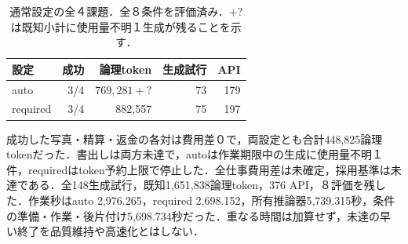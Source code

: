 \begin{table}[tb]
\centering\footnotesize\setlength{\tabcolsep}{3pt}
\caption{通常設定の全４課題．全８条件を評価済み．$+?$は既知小計に使用量不明１生成が残ることを示す．}
\begin{tabular}{lrrrr}
設定 & 成功 & 論理token & 生成試行 & API \\ \hline
auto & 3/4 & $769,281+?$ & 73 & 179 \\
required & 3/4 & 882,557 & 75 & 197 \\
\hline\end{tabular}
\end{table}
成功した写真・精算・返金の各対は費用差０で，両設定とも合計448,825論理tokenだった．書出しは両方未達で，autoは作業期限中の生成に使用量不明１件，requiredはtoken予約上限で停止した．全仕事費用差は未確定，採用基準は未達である．全148生成試行，既知1,651,838論理token，376 API，８評価を残した．作業秒はauto 2,976.265，required 2,698.152，所有推論器5,739.315秒，条件の準備・作業・後片付け5,698.734秒だった．重なる時間は加算せず，未達の早い終了を品質維持や高速化とはしない．
